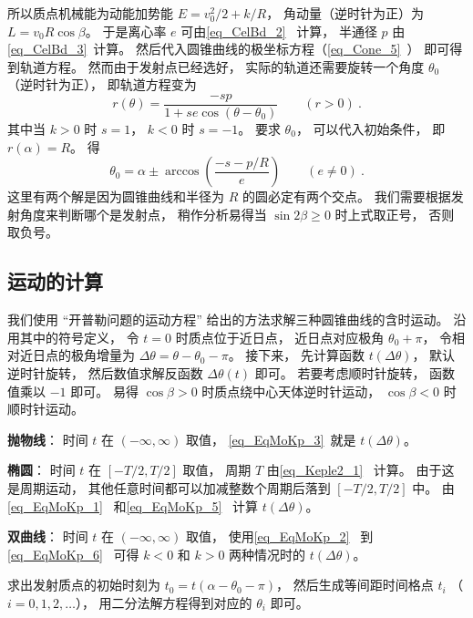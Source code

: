 所以质点机械能为动能加势能 $E = v_0^2/2 + k/R$， 角动量（逆时针为正）为 $L = v_0 R\cos\beta$。 于是离心率 $e$ 可由\autoref{eq_CelBd_2}~ 计算， 半通径 $p$ 由\autoref{eq_CelBd_3}~计算。 然后代入圆锥曲线的极坐标方程（\autoref{eq_Cone_5}~） 即可得到轨道方程。 然而由于发射点已经选好， 实际的轨道还需要旋转一个角度 $\theta_0$ （逆时针为正）， 即轨道方程变为
\begin{equation}\label{eq_KepNum_1}
r(\theta)  = \frac{-s p}{1 + s e\cos (\theta-\theta_0)} \qquad (r > 0)~.
\end{equation}
其中当 $k>0$ 时 $s=1$， $k<0$ 时 $s=-1$。 要求 $\theta_0$， 可以代入初始条件， 即 $r(\alpha) = R$。 得
\begin{equation}
\theta_0 = \alpha \pm \arccos(\frac{-s - p/R}{e}) \qquad (e\ne 0)~.
\end{equation}
这里有两个解是因为圆锥曲线和半径为 $R$ 的圆必定有两个交点。 我们需要根据发射角度来判断哪个是发射点， 稍作分析易得当 $\sin2\beta \geqslant 0$ 时上式取正号， 否则取负号。

\subsection{运动的计算}
我们使用 “开普勒问题的运动方程” 给出的方法求解三种圆锥曲线的含时运动。 沿用其中的符号定义， 令 $t=0$ 时质点位于近日点，  近日点对应极角 $\theta_0 + \pi$， 令相对近日点的极角增量为 $\Delta\theta = \theta - \theta_0 - \pi$。 接下来， 先计算函数 $t(\Delta\theta)$， 默认逆时针旋转， 然后数值求解反函数 $\Delta\theta(t)$ 即可。 若要考虑顺时针旋转， 函数值乘以 $-1$ 即可。 易得 $\cos\beta > 0$ 时质点绕中心天体逆时针运动， $\cos\beta < 0$ 时顺时针运动。

\textbf{抛物线}： 时间 $t$ 在 $(-\infty,\infty)$ 取值， \autoref{eq_EqMoKp_3}~就是 $t(\Delta\theta)$。

\textbf{椭圆}： 时间 $t$ 在 $[-T/2,T/2]$ 取值， 周期 $T$ 由\autoref{eq_Keple2_1}~ 计算。 由于这是周期运动， 其他任意时间都可以加减整数个周期后落到 $[-T/2,T/2]$ 中。 由\autoref{eq_EqMoKp_1}~ 和\autoref{eq_EqMoKp_5}~ 计算 $t(\Delta\theta)$。

\textbf{双曲线}： 时间 $t$ 在 $(-\infty,\infty)$ 取值， 使用\autoref{eq_EqMoKp_2}~ 到\autoref{eq_EqMoKp_6}~ 可得 $k<0$ 和 $k>0$ 两种情况时的 $t(\Delta\theta)$。

求出发射质点的初始时刻为 $t_0 = t(\alpha - \theta_0 - \pi)$， 然后生成等间距时间格点 $t_i$ （$i=0,1,2,\dots$）， 用二分法解方程得到对应的 $\theta_i$ 即可。

